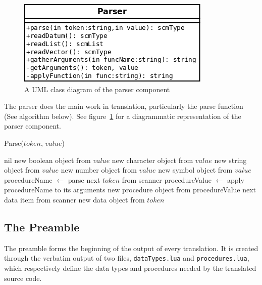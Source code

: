 \begin{figure}
\centering
\includegraphics[width=\textwidth]{parserUML.png}
\caption{A UML class diagram of the parser component}
\label{fig:parserUML}
\end{figure}

The parser does the main work in translation, particularly the parse function
(See algorithm below).
See figure~\ref{fig:parserUML} for a diagrammatic representation of the parser
component.

\begin{algorithm}
\caption{Parse($token$, $value$)}
\label{alg:parse}
\begin{algorithmic}
\RETURN nil
\RETURN new boolean object from $value$
\RETURN new character object from $value$
\RETURN new string object from $value$
\RETURN new number object from $value$
\RETURN new symbol object from $value$
\ELSIF{$token$ = $($ or $token$ = $[$}
\STATE procedureName $\leftarrow$ parse next $token$ from scanner
\STATE procedureValue $\leftarrow$ apply procedureName to its arguments
\RETURN new procedure object from procedureValue
\RETURN next data item from scanner
\ELSE
\RETURN new data object from $token$
\ENDIF
\end{algorithmic}
\end{algorithm}

\subsection{The Preamble}

The preamble forms the beginning of the output of every translation. It is
created through the verbatim output of two files, \texttt{dataTypes.lua} and
\texttt{procedures.lua}, which respectively define the data types and procedures
needed by the translated source code.

